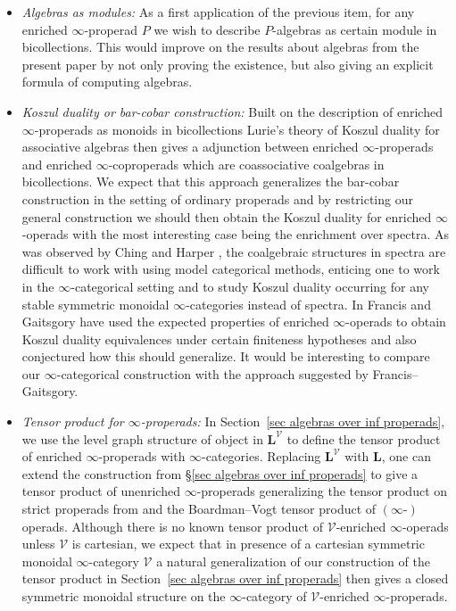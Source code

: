 \documentclass{amsart}
\numberwithin{theorem}{subsection}
\theoremstyle{definition}
\newcommand{\xV}{\mathcal{V}}
\newcommand{\levelg}{\mathbf{L}}
\newcommand{\levelV}{\levelg^\xV}
\begin{document}
\begin{itemize}[leftmargin=*]
\item \emph{Algebras as modules:} 
As a first application of the previous item, for any enriched $\infty$-properad $P$ we wish to describe $P$-algebras as certain module in bicollections.
This would improve on the results about algebras from the present paper by not only proving the existence, but also giving an explicit formula of computing algebras.
\item \emph{Koszul duality or bar-cobar construction:} 
Built on the description of enriched $\infty$-properads as monoids in bicollections Lurie's theory of Koszul duality for associative algebras \cite[\S 5.2]{ha} then gives a adjunction between enriched $\infty$-properads and enriched $\infty$-coproperads which are coassociative coalgebras in bicollections.
We expect that this approach generalizes the bar-cobar construction in the setting of ordinary properads and by restricting our general construction we should then obtain the Koszul duality for enriched $\infty$-operads with the most interesting case being the enrichment over spectra.
As was observed by Ching and Harper \cite{ChingBar,ChingHarper}, the coalgebraic structures in spectra are difficult to work with using model categorical methods, enticing one to work in the $\infty$-categorical setting and to study Koszul duality occurring for any stable symmetric monoidal $\infty$-categories instead of spectra.
In \cite{FrancisGaitsgory} Francis and Gaitsgory have used the expected properties of enriched $\infty$-operads to obtain Koszul duality equivalences under certain finiteness hypotheses and also conjectured how this should generalize.
It would be interesting to compare our $\infty$-categorical construction with the approach suggested by Francis--Gaitsgory.
\item \emph{Tensor product for $\infty$-properads:} 
In Section~\ref{sec algebras over inf properads}, we use the level graph structure of object in $\levelV$ to define the tensor product of enriched $\infty$-properads with $\infty$-categories. 
Replacing $\levelV$ with $\levelg$, one can extend the construction from \S\ref{sec algebras over inf properads} to give a tensor product of unenriched $\infty$-properads generalizing the tensor product on strict properads from \cite[\S 4.2]{hrybook} and the Boardman--Vogt tensor product of $(\infty\text{-})$operads.
Although there is no known tensor product of $\xV$-enriched $\infty$-operads unless $\xV$ is cartesian, we expect that in presence of a cartesian symmetric monoidal $\infty$-category $\xV$ a natural generalization of our construction of the tensor product in Section~\ref{sec algebras over inf properads} then gives a closed symmetric monoidal structure on the $\infty$-category of $\xV$-enriched $\infty$-properads. 

\end{itemize}
\end{document}
